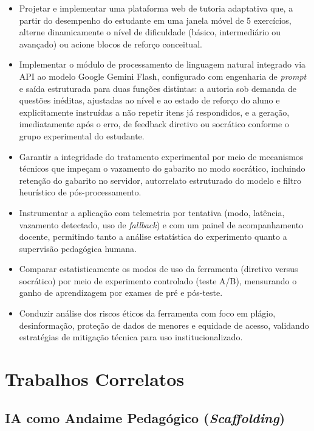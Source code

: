 \documentclass[10pt, a4paper, twocolumn]{article}
\begin{document}
\begin{itemize}[leftmargin=0.4cm, itemsep=2pt, parsep=0pt]
  \item Projetar e implementar uma plataforma web de tutoria adaptativa que,
  a partir do desempenho do estudante em uma janela móvel de 5 exercícios,
  alterne dinamicamente o nível de dificuldade (básico, intermediário ou
  avançado) ou acione blocos de reforço conceitual.
  \item Implementar o módulo de processamento de linguagem natural integrado via
  API ao modelo Google Gemini Flash, configurado com engenharia de
  \textit{prompt} e saída estruturada para duas funções distintas: a autoria sob
  demanda de questões inéditas, ajustadas ao nível e ao estado de reforço do
  aluno e explicitamente instruídas a não repetir itens já respondidos, e a
  geração, imediatamente após o erro, de feedback diretivo ou socrático conforme
  o grupo experimental do estudante.
  \item Garantir a integridade do tratamento experimental por meio de
  mecanismos técnicos que impeçam o vazamento do gabarito no modo socrático,
  incluindo retenção do gabarito no servidor, autorrelato estruturado do modelo
  e filtro heurístico de pós-processamento.
  \item Instrumentar a aplicação com telemetria por tentativa (modo, latência,
  vazamento detectado, uso de \textit{fallback}) e com um painel de
  acompanhamento docente, permitindo tanto a análise estatística do experimento
  quanto a supervisão pedagógica humana.
  \item Comparar estatisticamente os modos de uso da ferramenta (diretivo versus
  socrático) por meio de experimento controlado (teste A/B), mensurando o ganho
  de aprendizagem por exames de pré e pós-teste.
  \item Conduzir análise dos riscos éticos da ferramenta com foco em plágio,
  desinformação, proteção de dados de menores e equidade de acesso, validando
  estratégias de mitigação técnica para uso institucionalizado.
\end{itemize}

\section{Trabalhos Correlatos}
\label{sec:correlatos}

\subsection{IA como Andaime Pedagógico (\textit{Scaffolding})}
\end{document}
